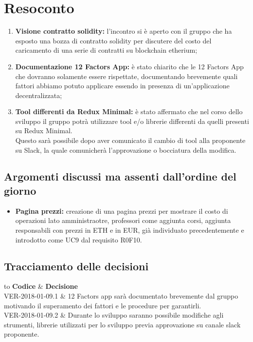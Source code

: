 \documentclass[VER-2018-01-09.tex]{subfiles}
\begin{document}
\chapter{Resoconto}
\begin{enumerate}
	\item \textbf{Visione contratto solidity:} l'incontro si è aperto con il gruppo \gruppo che ha esposto una bozza di contratto solidity per discutere del costo del caricamento di una serie di contratti su blockchain etherium;
	
	\item \textbf{Documentazione 12 Factors App:} è stato chiarito che le 12 Factors App che dovranno solamente essere rispettate, documentando brevemente quali fattori abbiamo potuto applicare essendo in presenza di un'applicazione decentralizzata;
	
	\item \textbf{Tool differenti da Redux Minimal:} è stato affermato che nel corso dello sviluppo il gruppo potrà utilizzare tool e/o librerie differenti da quelli presenti su Redux Minimal.\\
	Questo sarà possibile dopo aver comunicato il cambio di tool alla proponente su Slack, la quale comunicherà l'approvazione o bocciatura della modifica.
\end{enumerate}
\section{Argomenti discussi ma assenti dall'ordine del giorno}
\begin{itemize}
	\item \textbf{Pagina prezzi:} creazione di una pagina prezzi per mostrare il costo di operazioni lato amministraotre, professori come aggiunta corsi, aggiunta responsabili con prezzi in ETH e in EUR, già individuato precedentemente e introdotto come UC9 dal requisito R0F10.
\end{itemize}
\section{Tracciamento delle decisioni}
\begin{table}[H]
	\begin{center}
		\begin{tabu} to 
			\tableHeaderStyle
			\textbf{Codice} & \textbf{Decisione} \\
			VER-2018-01-09.1 & 12 Factors app sarà documentato brevemente dal gruppo motivando il superamento dei fattori e le procedure per garantirli. \\
			VER-2018-01-09.2 & Durante lo sviluppo saranno possibile modifiche agli strumenti, librerie utilizzati per lo sviluppo previa approvazione su canale slack proponente. \\
		\end{tabu}
	\caption{Tracciamento delle decisioni del verbale}
	\end{center}
\end{table}
\end{document}
